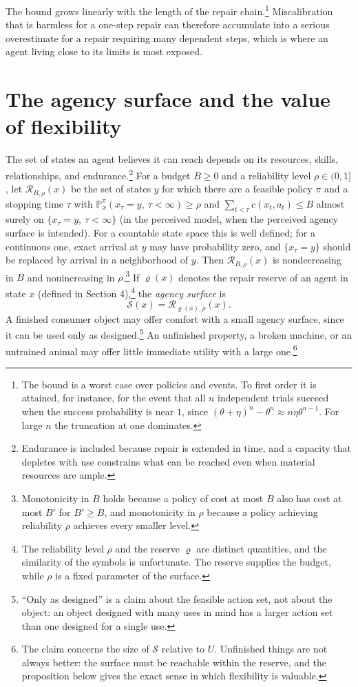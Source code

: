 \documentclass[11pt]{article}
\theoremstyle{remark}
\renewcommand{\Pr}{\mathbb{P}}
\begin{document}
The bound grows linearly with the length of the repair chain.\footnote{The bound is a worst case over policies and events. To first order it is attained, for instance, for the event that all $n$ independent trials succeed when the success probability is near $1$, since $(\theta+\eta)^n-\theta^n\approx n\eta\theta^{n-1}$. For large $n$ the truncation at one dominates.} Miscalibration that is harmless for a one-step repair can therefore accumulate into a serious overestimate for a repair requiring many dependent steps, which is where an agent living close to its limits is most exposed.

\section{The agency surface and the value of flexibility}

The set of states an agent believes it can reach depends on its resources, skills, relationships, and endurance.\footnote{Endurance is included because repair is extended in time, and a capacity that depletes with use constrains what can be reached even when material resources are ample.} For a budget $B\ge0$ and a reliability level $\rho\in(0,1]$, let $\mathcal R_{B,\rho}(x)$ be the set of states $y$ for which there are a feasible policy $\pi$ and a stopping time $\tau$ with $\Pr^\pi_x(x_\tau=y,\ \tau<\infty)\ge\rho$ and $\sum_{t<\tau}c(x_t,a_t)\le B$ almost surely on $\{x_\tau=y,\ \tau<\infty\}$ (in the perceived model, when the perceived agency surface is intended). For a countable state space this is well defined; for a continuous one, exact arrival at $y$ may have probability zero, and $\{x_\tau=y\}$ should be replaced by arrival in a neighborhood of $y$. Then $\mathcal R_{B,\rho}(x)$ is nondecreasing in $B$ and nonincreasing in $\rho$.\footnote{Monotonicity in $B$ holds because a policy of cost at most $B$ also has cost at most $B'$ for $B'\ge B$, and monotonicity in $\rho$ because a policy achieving reliability $\rho$ achieves every smaller level.} If $\varrho(x)$ denotes the repair reserve of an agent in state $x$ (defined in Section 4),\footnote{The reliability level $\rho$ and the reserve $\varrho$ are distinct quantities, and the similarity of the symbols is unfortunate. The reserve supplies the budget, while $\rho$ is a fixed parameter of the surface.} the \emph{agency surface} is
\[
\mathcal S(x)=\mathcal R_{\varrho(x),\rho}(x).
\]
A finished consumer object may offer comfort with a small agency surface, since it can be used only as designed.\footnote{``Only as designed'' is a claim about the feasible action set, not about the object: an object designed with many uses in mind has a larger action set than one designed for a single use.} An unfinished property, a broken machine, or an untrained animal may offer little immediate utility with a large one.\footnote{The claim concerns the size of $\mathcal S$ relative to $U$. Unfinished things are not always better: the surface must be reachable within the reserve, and the proposition below gives the exact sense in which flexibility is valuable.}
\end{document}
